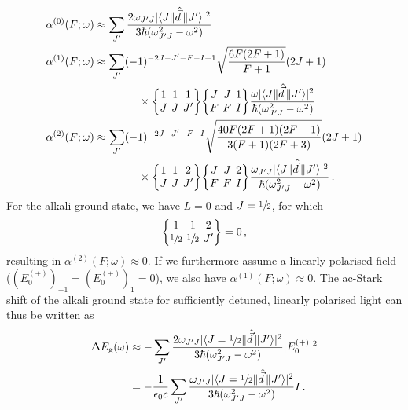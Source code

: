 \documentclass[../Thesis-IJspeert.tex]{subfiles}
\begin{document}
\begin{align}
	\begin{split}
	 \alpha^{(0)}(F ; \omega) &\approx \sum_{J'} \frac{2 \omega_{J' J}\lvert \langle J\| \hat{\vec{d}}\, \| J'\rangle\rvert ^2}{3 \hbar\left(\omega_{J' J}^2-\omega^2\right)} \\
	 \alpha^{(1)}(F ; \omega) &\approx \sum_{J'}(-1)^{-2 J-J'-F-I+1} \sqrt{\frac{6 F(2 F+1)}{F+1}}(2 J+1) \\ 
	 &\hspace{4em}\times \tj{1}{1}{1}{J}{J}{J'} \tj{J}{J}{1}{F}{F}{I} \frac{\omega\lvert \langle J\| \hat{\vec{d}}\, \| J'\rangle\rvert ^2}{\hbar\left(\omega_{J' J}^2-\omega^2\right)}\\
	 \alpha^{(2)}(F ; \omega) &\approx \sum_{J'}(-1)^{-2 J-J'-F-I} \sqrt{\frac{40 F(2 F+1)(2 F-1)}{3(F+1)(2 F+3)}}(2 J+1)  \\
	&\hspace{4em}\times \tj{1}{1}{2}{J}{J}{J'}\tj{J}{J}{2}{F}{F}{I} \frac{\omega_{J' J}\lvert \langle J\| \hat{\vec{d}}\, \| J' \rangle\rvert^2}{\hbar\left(\omega_{J' J}^2-\omega^2\right)}\,.
\end{split}
\end{align}
For the alkali ground state, we have $L=0$ and $J=\sfrac{1}{2}$, for which
\begin{align}
\tj{1}{1}{2}{\sfrac{1}{2}}{\sfrac{1}{2}}{J'}=0\,,
\end{align}
resulting in $\alpha^{(2)}(F ; \omega) \approx 0$. If we furthermore assume a linearly polarised field ($(E_0^{(+)})_{-1} = (E_0^{(+)})_{1}=0$), we also have $\alpha^{(1)}(F ; \omega) \approx 0$. The ac-Stark shift of the alkali ground state for sufficiently detuned, linearly polarised light can thus be written as
\begin{align}
\begin{split}
\Delta E_\text{g}\left(\omega\right) &\approx - \sum_{J'} \frac{2 \omega_{J' J}\lvert \langle J=\sfrac{1}{2} \| \hat{\vec{d}}\, \| J'\rangle\rvert ^2}{3 \hbar\left(\omega_{J' J}^2-\omega^2\right)} \lvert E_0^{(+)}\rvert ^2 \\&= -\frac{1}{\epsilon_0 c} \sum_{J'} \frac{\omega_{J' J}\lvert \langle J=\sfrac{1}{2} \| \hat{\vec{d}}\, \| J'\rangle\rvert ^2}{3 \hbar\left(\omega_{J' J}^2-\omega^2\right)} I \,.
\end{split}
\end{align}
\end{document}

